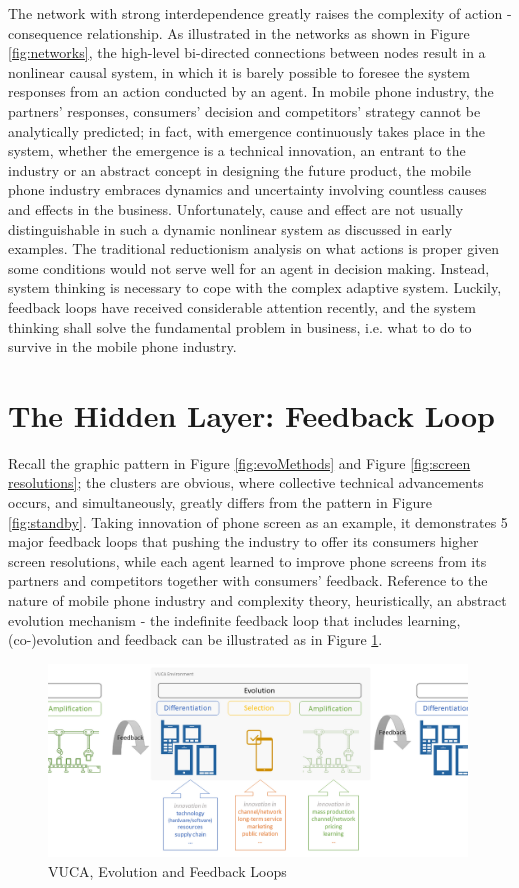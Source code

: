 \documentclass[utf8,english]{gradu3}
\begin{document}
The network with strong interdependence greatly raises the complexity of action - consequence relationship. As illustrated in the networks as shown in Figure \ref{fig:networks}, the high-level bi-directed connections between nodes result in a nonlinear causal system, in which it is barely possible to foresee the system responses from an action conducted by an agent. In mobile phone industry, the partners' responses, consumers' decision and competitors' strategy cannot be analytically predicted; in fact, with emergence continuously takes place in the system, whether the emergence is a technical innovation, an entrant to the industry or an abstract concept in designing the future product, the mobile phone industry embraces dynamics and uncertainty involving countless causes and effects in the business. Unfortunately, cause and effect are not usually distinguishable in such a dynamic nonlinear system as discussed in early examples. The traditional reductionism analysis on what actions is proper given some conditions would not serve well for an agent in decision making. Instead, system thinking is necessary to cope with the complex adaptive system. Luckily, feedback loops have received considerable attention recently, and the system thinking shall solve the fundamental problem in business, i.e. what to do to survive in the mobile phone industry.

\section{The Hidden Layer: Feedback Loop}

Recall the graphic pattern in Figure \ref{fig:evoMethods} and Figure \ref{fig:screen resolutions}; the clusters are obvious, where collective technical advancements occurs, and simultaneously, greatly differs from the pattern in Figure \ref{fig:standby}. Taking innovation of phone screen as an example, it demonstrates 5 major feedback loops that pushing the industry to offer its consumers higher screen resolutions, while each agent learned to improve phone screens from its partners and competitors together with consumers' feedback. Reference to the nature of mobile phone industry and complexity theory, heuristically, an abstract evolution mechanism - the indefinite feedback loop that includes learning, (co-)evolution and feedback can be illustrated as in Figure \ref{fig:feeback loops}.

\begin{figure}[htb]
    \centering
    \includegraphics[width=0.99\textwidth]{feedback.png}
    \caption{VUCA, Evolution and Feedback Loops}
    \label{fig:feeback loops}
\end{figure}
\end{document}
